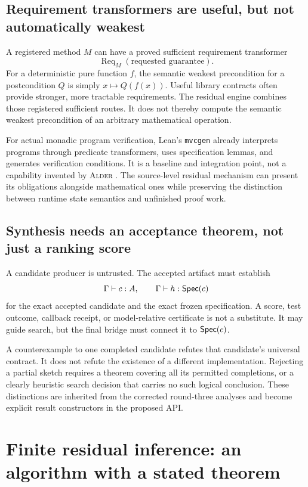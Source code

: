 \documentclass[11pt,a4paper]{article}
\newcommand{\code}[1]{\nolinkurl{#1}}
\newcommand{\Alder}{\textsc{Alder}}
\theoremstyle{plain}
\theoremstyle{definition}
\theoremstyle{remark}
\begin{document}
\subsection{Requirement transformers are useful, but not automatically weakest}
A registered method $M$ can have a proved sufficient requirement transformer
\[
 \operatorname{Req}_M(\text{requested guarantee}).
\]
For a deterministic pure function $f$, the semantic weakest precondition for a postcondition $Q$ is simply $x\mapsto Q(f(x))$. Useful library contracts often provide stronger, more tractable requirements. The residual engine combines those registered sufficient routes. It does not thereby compute the semantic weakest precondition of an arbitrary mathematical operation.

For actual monadic program verification, Lean's \code{mvcgen} already interprets programs through predicate transformers, uses specification lemmas, and generates verification conditions. It is a baseline and integration point, not a capability invented by \Alder{} \cite{mvcgen}. The source-level residual mechanism can present its obligations alongside mathematical ones while preserving the distinction between runtime state semantics and unfinished proof work.

\subsection{Synthesis needs an acceptance theorem, not just a ranking score}
A candidate producer is untrusted. The accepted artifact must establish
\[
 \Gamma\vdash c:A,\qquad \Gamma\vdash h:\mathsf{Spec}(c)
\]
for the exact accepted candidate and the exact frozen specification. A score, test outcome, callback receipt, or model-relative certificate is not a substitute. It may guide search, but the final bridge must connect it to $\mathsf{Spec}(c)$.

A counterexample to one completed candidate refutes that candidate's universal contract. It does not refute the existence of a different implementation. Rejecting a partial sketch requires a theorem covering all its permitted completions, or a clearly heuristic search decision that carries no such logical conclusion. These distinctions are inherited from the corrected round-three analyses and become explicit result constructors in the proposed API.

\section{Finite residual inference: an algorithm with a stated theorem}\label{sec:inference}
\end{document}
